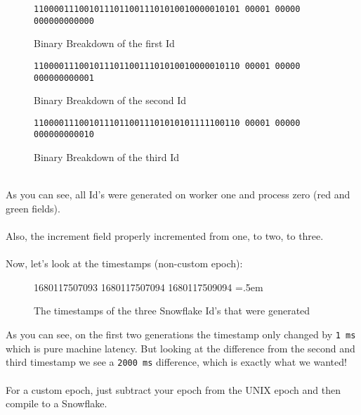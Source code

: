 \documentclass{article}
\newcommand{\code}[1]{\colorbox{cverbbg}{\texttt{#1}}}
\newcommand{\hn}[0]{\hfill \\}
\newenvironment{lcverbatim}
{\SaveVerbatim{cverb}}
{\endSaveVerbatim{}
	\flushleft\fboxrule=0pt\fboxsep=.5em
	\colorbox{cverbbg}{%

		\makebox[\dimexpr\linewidth-2\fboxsep][l]{\BUseVerbatim{cverb}}%
	}
	\endflushleft{}
}
\begin{document}
\begin{figure}[H]
	\large{\texttt{\color{cyan}11000011100101110110011101010010000010101
			\color{red}00001 \color{green}00000
			\color{gray}000000000000}}
	\\
	\caption{Binary Breakdown of the first Id}\label{fig:breakdown_1}
\end{figure}

\begin{figure}[H]
	\large{\texttt{\color{cyan}11000011100101110110011101010010000010110
			\color{red}00001 \color{green}00000
			\color{gray}000000000001}}
	\\
	\caption{Binary Breakdown of the second Id}\label{fig:breakdown_2}
\end{figure}

\begin{figure}[H]
	\large{\texttt{\color{cyan}11000011100101110110011101010101111100110
			\color{red}00001 \color{green}00000
			\color{gray}000000000010}}
	\\
	\caption{Binary Breakdown of the third Id}\label{fig:breakdown_3}
\end{figure}

\hn{}
As you can see, all Id's were generated on worker one and process zero (red and
green fields). \\
\hn{}
Also, the increment field properly incremented from one, to two, to three.
\\
\hn{}
Now, let's look at the timestamps (non-custom epoch):

\begin{figure}[H]
	\begin{lcverbatim}
	1680117507093
	1680117507094
	1680117509094
	\end{lcverbatim}
	\caption{The timestamps of the three Snowflake Id's that were
		generated}\label{fig:breakdown_timestamps}
\end{figure}
As you can see, on the first two generations the timestamp only changed by
\code{1 ms} which is pure machine latency.
But looking at the difference from the second and third timestamp we see a
\code{2000 ms} difference, which is exactly what we wanted! \\
\hn{}
For a custom epoch, just subtract your epoch from the UNIX epoch and then
compile to a Snowflake.

\break{}
\end{document}
